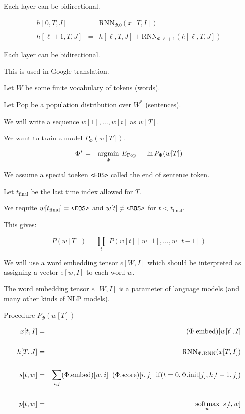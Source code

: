 {Each layer can be bidirectional.


\begin{eqnarray*}
h[0,T,J] & = & \mathrm{RNN}_{\Phi.0}(x[T,I]) \\
\\
h[\ell+1,T,J] & = & h[\ell,T,J] + \mathrm{RNN}_{\Phi.\ell+1}(h[\ell,T,J])
\end{eqnarray*}

\vfill
Each layer can be bidirectional.

\vfill
This is used in Google translation.


Let $W$ be some finite vocabulary of tokens (words).

\vfill
Let $\mathrm{Pop}$ be a population distribution over $W^*$ (sentences).

\vfill
We will write a sequence $w[1],\ldots,w[t]$ as $w[T]$.

\vfill
We want to train a model $P_\Phi(w[T])$.

\begin{eqnarray*}
\Phi^* & = & \operatorname*{argmin}_\Phi \; E_{\mathrm{Pop}}\;-\ln P_\Phi(w[T])
\end{eqnarray*}


\vfill
We assume a special toeken {\tt <EOS>} called the end of sentence token.

\vfill
Let $t_{\mathrm{final}}$ be the last time index allowed for $T$.

\vfill
We requite $w[t_{\mathrm{final}}] = \mbox{\tt <EOS>}$ and $w[t] \not = \mbox{\tt <EOS>}$ for $t < t_{\mathrm{final}}$.

\vfill
This gives:

$$P(w[T]) = \prod_t\;P(w[t]\;|\;w[1],\ldots,w[t-1])$$



We will use a word embedding tensor $e[W,I]$ which should be interpreted as assigning a vector $e[w,I]$ to each word $w$.

\vfill
The word embedding tensor $e[W,I]$ is a parameter of language models (and many other kinds of NLP models).


Procedure $P_\Phi(w[T])$

\vfill
{\huge \begin{eqnarray*}
x[t,I] & = & (\Phi.\mathrm{embed})[w[t],I] \\
\\
h[T,J] & = & \mathrm{RNN}_{\Phi.\mathrm{RNN}}(x[T,I]) \\
\\
s[t,w] & = & \sum_{i,j} (\Phi.\mathrm{embed})[w,i]\;\;(\Phi.\mathrm{score})[i,j]\;\;\mathrm{if}(t=0,\Phi.\mathrm{init}[j],h[t-1,j]) \\
\\
p[t,w] & = & \operatorname*{softmax}_w\;s[t,w]
\end{eqnarray*}
}

}
